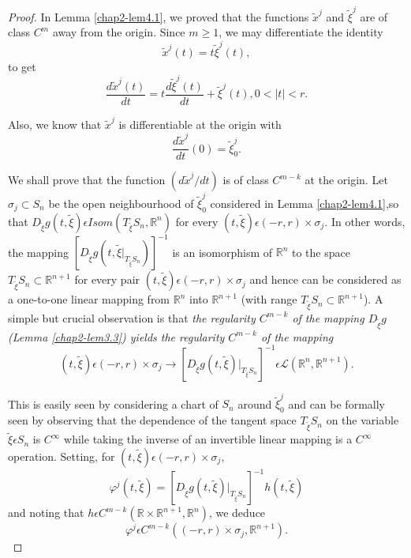 \begin{proof}
In Lemma \ref{chap2-lem4.1}, we proved that the functions
$\widetilde{x}^{j}$ and $\widetilde{\xi}^{j}$ are of class $C^{m}$
away from the origin. Since $m \geq 1$, we may differentiate the
identity
$$
\widetilde{x}^{j}(t) = t\widetilde{\xi}^{j}(t),
$$
to get
\begin{equation*}
\frac{d\widetilde{x}^{j}(t)}{dt} = t
\frac{d\widetilde{\xi}^{j}(t)}{dt} + \widetilde{\xi}^{j}(t), 0 < |t| <
r.\tag{4.7}\label{chap2-eq4.7} 
\end{equation*}

Also, we know that $\widetilde{x}^{j}$ is differentiable at the origin
with 
$$
\frac{d\widetilde{x}^{j}}{dt} (0) = \widetilde{\xi}_{0}^{j}.
$$

We shall prove that the function $(d\widetilde{x}^{j} / dt)$ is of
class $C^{m-k}$ at the origin. Let $\sigma_{j} \subset S_{n}$ be the
open neighbourhood of $\widetilde{\xi}_{0}^{j}$ considered in
Lemma \ref{chap2-lem4.1},\pageoriginale so that
$D_{\widetilde{\xi}}g(t, \widetilde{\xi}) \epsilon Isom
(T_{\widetilde{\xi}}S_{n}, \mathbb{R}^{n})$ for every $(t,
\widetilde{\xi}) \epsilon (-r, r) \times \sigma_{j}$. In other words,
the mapping $\left[D_{\widetilde{\xi}}g(t, \widetilde{\xi}
  |_{T_{\widetilde{\xi}}S_{n}})\right]^{-1}$ is an isomorphism of
$\mathbb{R}^{n}$ to the space $T_{\widetilde{\xi}}S_{n} \subset
\mathbb{R}^{n+1}$ for every pair $(t, \widetilde{\xi}) \epsilon (-r,
r) \times \sigma_{j}$ and hence can be considered as a one-to-one
linear mapping from $\mathbb{R}^{n}$ into $\mathbb{R}^{n+1}$ (with
range $T_{\widetilde{\xi}}S_{n} \subset \mathbb{R}^{n+1}$). A simple
but crucial observation is that {\em the regularity $C^{m-k}$ of the
  mapping $D_{\widetilde{\xi}}g$ (Lemma \ref{chap2-lem3.3}) yields the
regularity $C^{m-k}$ of the mapping}
$$
(t, \widetilde{\xi}) \epsilon (-r, r) \times \sigma_{j} \to
\left[D_{\widetilde{\xi}}g(t, \widetilde{\xi})
  |_{T_{\widetilde{\xi}}S_{n}}\right]^{-1} \epsilon \mathscr{L}
(\mathbb{R}^{n}, \mathbb{R}^{n+1}).
$$

This is easily seen by considering a chart of $S_{n}$ around
$\widetilde{\xi}_{0}^{j}$ and can be formally seen by observing that
the dependence of the tangent space $T_{\widetilde{\xi}}S_{n}$ on the
variable $\widetilde{\xi} \epsilon S_{n}$ is $C^{\infty}$ while taking
the inverse of an invertible linear mapping is a $C^{\infty}$
operation. Setting, for $(t, \widetilde{\xi}) \epsilon (-r, r) \times
\sigma_{j}$, 
$$
\varphi^{j} (t, \widetilde{\xi}) = \left[D_{\widetilde{\xi}}g(t,
  \widetilde{\xi}) |_{T_{\widetilde{\xi}}S_{n}}\right]^{-1} h(t, \widetilde{\xi})
$$
and noting that $h \epsilon C^{m-k} (\mathbb{R} \times
\mathbb{R}^{n+1}, \mathbb{R}^{n})$, we deduce
$$
\varphi^{j} \epsilon C^{m-k} ((-r, r) \times \sigma_{j}, \mathbb{R}^{n+1}).
$$


\end{proof}
